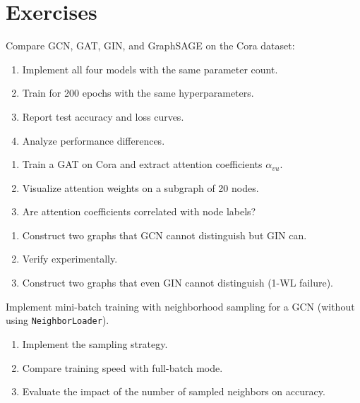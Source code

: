 \section*{Exercises}

\begin{exercise}
Compare GCN, GAT, GIN, and GraphSAGE on the Cora dataset:
\begin{enumerate}
    \item Implement all four models with the same parameter count.
    \item Train for 200 epochs with the same hyperparameters.
    \item Report test accuracy and loss curves.
    \item Analyze performance differences.
\end{enumerate}
\end{exercise}

\begin{exercise}
\begin{enumerate}
    \item Train a GAT on Cora and extract attention coefficients $\alpha_{vu}$.
    \item Visualize attention weights on a subgraph of 20 nodes.
    \item Are attention coefficients correlated with node labels?
\end{enumerate}
\end{exercise}

\begin{exercise}
\begin{enumerate}
    \item Construct two graphs that GCN cannot distinguish but GIN can.
    \item Verify experimentally.
    \item Construct two graphs that even GIN cannot distinguish (1-WL failure).
\end{enumerate}
\end{exercise}

\begin{exercise}
Implement mini-batch training with neighborhood sampling for a GCN (without
using \texttt{NeighborLoader}).
\begin{enumerate}
    \item Implement the sampling strategy.
    \item Compare training speed with full-batch mode.
    \item Evaluate the impact of the number of sampled neighbors on accuracy.
\end{enumerate}
\end{exercise}
